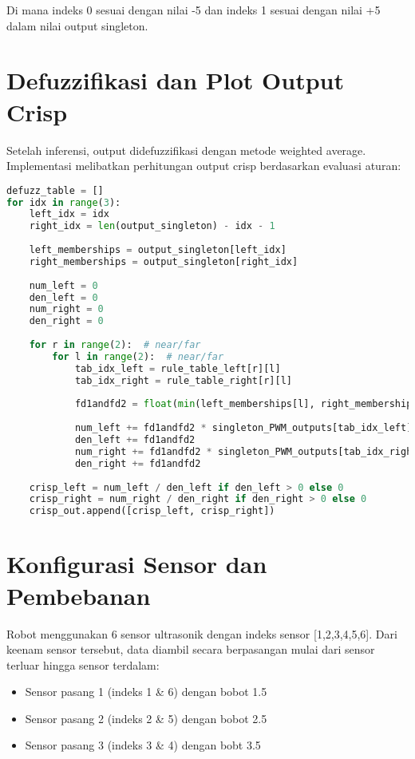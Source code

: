 \documentclass[a4paper,11pt]{article}
\begin{document}
Di mana indeks 0 sesuai dengan nilai -5 dan indeks 1 sesuai dengan nilai +5 dalam nilai output singleton.

\section{Defuzzifikasi dan Plot Output Crisp}
Setelah inferensi, output didefuzzifikasi dengan metode weighted average. Implementasi melibatkan perhitungan output crisp berdasarkan evaluasi aturan:

\begin{lstlisting}[language=Python, caption=Implementasi Defuzzifikasi]
defuzz_table = []
for idx in range(3):
    left_idx = idx
    right_idx = len(output_singleton) - idx - 1
    
    left_memberships = output_singleton[left_idx]
    right_memberships = output_singleton[right_idx]
    
    num_left = 0
    den_left = 0
    num_right = 0
    den_right = 0
    
    for r in range(2):  # near/far
        for l in range(2):  # near/far
            tab_idx_left = rule_table_left[r][l]
            tab_idx_right = rule_table_right[r][l]
            
            fd1andfd2 = float(min(left_memberships[l], right_memberships[r]))
            
            num_left += fd1andfd2 * singleton_PWM_outputs[tab_idx_left]
            den_left += fd1andfd2
            num_right += fd1andfd2 * singleton_PWM_outputs[tab_idx_right]
            den_right += fd1andfd2
    
    crisp_left = num_left / den_left if den_left > 0 else 0
    crisp_right = num_right / den_right if den_right > 0 else 0
    crisp_out.append([crisp_left, crisp_right])
\end{lstlisting}

\section{Konfigurasi Sensor dan Pembebanan}
Robot menggunakan 6 sensor ultrasonik dengan indeks sensor [1,2,3,4,5,6]. Dari keenam sensor tersebut, data diambil secara berpasangan mulai dari sensor terluar hingga sensor terdalam:

\begin{itemize}
    \item Sensor pasang 1 (indeks 1 \& 6) dengan bobot 1.5
    \item Sensor pasang 2 (indeks 2 \& 5) dengan bobot 2.5
    \item Sensor pasang 3 (indeks 3 \& 4) dengan bobt 3.5
\end{itemize}
\end{document}
